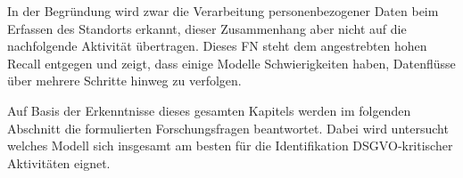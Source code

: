 In der Begründung wird zwar die Verarbeitung personenbezogener Daten beim Erfassen des Standorts erkannt, dieser Zusammenhang aber nicht auf die nachfolgende Aktivität übertragen. Dieses \ac{FN} steht dem angestrebten hohen Recall entgegen und zeigt, dass einige Modelle Schwierigkeiten haben, Datenflüsse über mehrere Schritte hinweg zu verfolgen.

Auf Basis der Erkenntnisse dieses gesamten Kapitels werden im folgenden Abschnitt die formulierten Forschungsfragen beantwortet. Dabei wird untersucht welches Modell sich insgesamt am besten für die Identifikation \ac{DSGVO}‑kritischer Aktivitäten eignet.